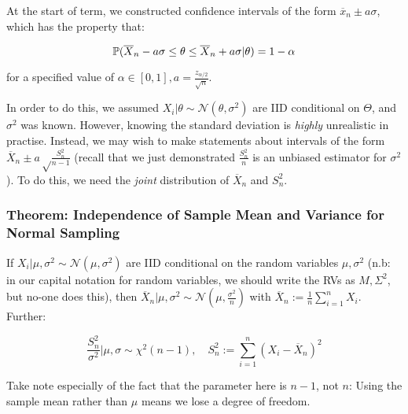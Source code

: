 \documentclass[a4paper]{article}
\begin{document}
            At the start of term, we constructed confidence intervals of the
            form $\overline x_n \pm a\sigma$, which has the property that:

            \[
                \mathbb{P}(\overline X_n - a\sigma \leq \theta \leq \overline X_n +
                a\sigma | \theta) = 1 - \alpha
            \]

            for a specified value of $\alpha \in [0, 1], a =
            \frac{z_{\alpha/2}}{\sqrt{n}}$.

            In order to do this, we assumed $X_i | \theta \sim
            \mathcal{N}(\theta, \sigma^2)$ are IID conditional on $\Theta$, and
            $\sigma^2$ was known. However, knowing the standard deviation is
            \textit{highly} unrealistic in practise. Instead, we may wish to
            make statements about intervals of the form $\overline X_n \pm a
            \sqrt\frac{S_n^2}{n - 1}$ (recall that we just demonstrated
            $\frac{S_n^2}{n}$ is an unbiased estimator for $\sigma^2$). To do
            this, we need the \textit{joint} distribution of $\overline X_n$ and
            $S_n^2$.

            \subsubsection{Theorem: Independence of Sample Mean and Variance for
            Normal Sampling}
                If $X_i | \mu, \sigma^2 \sim \mathcal{N}(\mu, \sigma^2)$ are IID
                conditional on the random variables $\mu, \sigma^2$ (n.b: in our
                capital notation for random variables, we should write the RVs
                as $M, \Sigma^2$, but no-one does this), then $\overline X_n |
                \mu, \sigma^2 \sim \mathcal{N}(\mu, \frac{\sigma^2}{n})$ with
                $\overline X_n := \frac{1}{n}\sum\limits_{i=1}^n X_i$. Further:

                \[
                    \frac{S_n^2}{\sigma^2} | \mu, \sigma \sim \chi^2(n - 1),
                    \quad S_n^2 := \sum_{i=1}^n (X_i - \overline X_n)^2
                \]

                \begin{warn}
                    Take note especially of the fact that the parameter here
                    is $n - 1$, not $n$: Using the sample mean rather than $\mu$
                    means we lose a degree of freedom.
                \end{warn}
\end{document}
